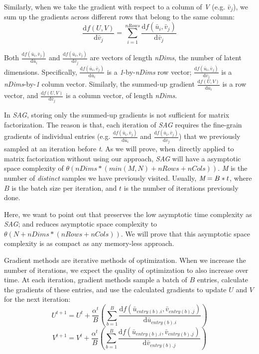 Similarly, when we take the gradient with respect to a column of \emph{V} (e.g. $\bar{v}_{j}$), we sum up the gradients across different rows that belong to the same column: 
\begin{equation} \label{eq:gradV}
\frac{\text{d}f(U,V)}{\text{d}\bar{v}_j} = \sum_{i=1}^{nRows} \frac{\text{d}f(\bar{u}_i,\bar{v}_j)}{\text{d}\bar{v}_j}
\end{equation}

Both $\frac{\text{d}f(\bar{u}_i,\bar{v}_j)}{\text{d}\bar{u}_i}$ and $\frac{\text{d}f(\bar{u}_i,\bar{v}_j)}{\text{d}\bar{v}_j}$ are vectors of length \emph{nDims}, the number of latent dimensions.
Specifically, $\frac{\text{d}f(\bar{u}_i,\bar{v}_j)}{\text{d}\bar{u}_i}$ is a \emph{1}-by-\emph{nDims} row vector;
$\frac{\text{d}f(\bar{u}_i,\bar{v}_j)}{\text{d}\bar{v}_j}$ is a \emph{nDims}-by-\emph{1} column vector.
Similarly, the summed-up gradient $\frac{\text{d}f(U,V)}{\text{d}\bar{u}_i}$ is a row vector, and $\frac{\text{d}f(U,V)}{\text{d}\bar{v}_j}$ is a column vector, of length \emph{nDims}.

In \emph{SAG}, storing only the summed-up gradients is not sufficient for matrix factorization.
The reason is that, each iteration of \emph{SAG} requires the fine-grain gradients of individual entries 
(e.g. $\frac{\text{d}f(\bar{u}_i,\bar{v}_j)}{\text{d}\bar{u}_i}$ and $\frac{\text{d}f(\bar{u}_i,\bar{v}_j)}{\text{d}\bar{v}_j}$) 
that we previously sampled at an iteration before \emph{t}.  
As we will prove, when directly applied to matrix factorization without using our \tool approach, \emph{SAG} will have a asymptotic space complexity of $\theta(nDims*(min(M,N)+nRows+nCols))$.
\emph{M} is the number of \emph{distinct} samples we have previously visited.  
Usually, $\emph{M} = B*t$, where $B$ is the batch size per iteration, and $t$ is the number of iterations previously done.  

Here, we want to point out that \tool preserves the low asymptotic time complexity as \emph{SAG}; and \tool reduces asymptotic space complexity to $\theta(N+nDims*(nRows+nCols))$. 
We will prove that this asymptotic space complexity is as compact as any memory-less approach.


Gradient methods are iterative methods of optimization.  
When we increase the number of iterations, we expect the quality of optimization to also increase over time.
At each iteration, gradient methods sample a batch of $B$ entries, calculate the gradients of these entries, and use the calculated gradients to update $U$ and $V$ for the next iteration:
\begin{equation} \label{eq:Ut}
U^{t+1} = U^t + \frac{\alpha^{t}}{B}\left(\sum_{b=1}^{B}\frac{\text{d}f(\bar{u}_{entry(b).i}, \bar{v}_{entry(b).j})}{\text{d}\bar{u}_{entry(b).i}}\right)
\end{equation}
\begin{equation} \label{eq:Vt}
V^{t+1} = V^t + \frac{\alpha^{t}}{B}\left(\sum_{b=1}^{B}\frac{\text{d}f(\bar{u}_{entry(b).i}, \bar{v}_{entry(b).j})}{\text{d}\bar{v}_{entry(b).j}}\right)
\end{equation}

